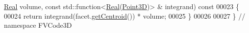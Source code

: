 \begin{DoxyCode}
      \hyperlink{namespaceFVCode3D_a40c1f5588a248569d80aa5f867080e83}{Real} volume, \textcolor{keyword}{const} std::function<\hyperlink{namespaceFVCode3D_a40c1f5588a248569d80aa5f867080e83}{Real}(\hyperlink{classFVCode3D_1_1Point3D}{Point3D})> & integrand)\textcolor{keyword}{ const}
00023 \textcolor{keyword}{}\{
00024         \textcolor{keywordflow}{return} integrand(facet.\hyperlink{classFVCode3D_1_1Rigid__Mesh_1_1Facet_a0d4bcc392ef3da56ccdb40c22b6319e3}{getCentroid}()) * volume;
00025 \}
00026 
00027 \} \textcolor{comment}{// namespace FVCode3D}
\end{DoxyCode}
